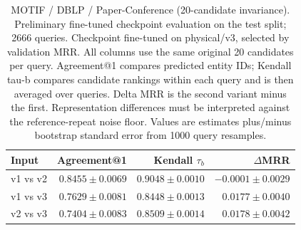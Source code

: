 \begin{table}[t]
\centering
\small
\begin{tabular}{lrrr}
\toprule
Input & Agreement@1 & Kendall $\tau_b$ & $\Delta$MRR \\
\midrule
v1 vs v2 & $0.8455 \pm 0.0069$ & $0.9048 \pm 0.0010$ & $-0.0001 \pm 0.0029$ \\
v1 vs v3 & $0.7629 \pm 0.0081$ & $0.8448 \pm 0.0013$ & $0.0177 \pm 0.0040$ \\
v2 vs v3 & $0.7404 \pm 0.0083$ & $0.8509 \pm 0.0014$ & $0.0178 \pm 0.0042$ \\
\bottomrule
\end{tabular}
\caption{MOTIF / DBLP / Paper-Conference (20-candidate invariance). Preliminary fine-tuned checkpoint evaluation on the test split; 2666 queries. Checkpoint fine-tuned on physical/v3, selected by validation MRR. All columns use the same original 20 candidates per query. Agreement@1 compares predicted entity IDs; Kendall tau-b compares candidate rankings within each query and is then averaged over queries. Delta MRR is the second variant minus the first. Representation differences must be interpreted against the reference-repeat noise floor. Values are estimates plus/minus bootstrap standard error from 1000 query resamples.}
\label{tab:motif-paper_conference-invariance}
\end{table}
